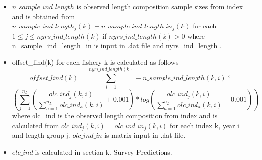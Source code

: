 \documentclass{article}
\begin{document}
\begin{itemize}
    \item $n\_sample\_ind\_length$ is observed length composition sample sizes from index
 and is obtained from $n\_sample\_ind\_length_j(k) = n\_sample\_ind\_length\_in_j(k)$ for each $1\leq j \leq nyrs\_ind\_length(k)$ if $nyrs\_ind\_length(k)>0$ 
 where n\_sample\_ind\_length\_in is input  %
 in .dat file  and nyrs\_ind\_length %
 .
\item offset\_lind(k) for each fishery k is calculated as follows
\begin{equation*}
    offset\_lind(k)=\displaystyle\sum_{i=1}^{nyrs\_ind\_length(k)}-n\_sample\_ind\_length(k,i)*
\end{equation*}
\begin{equation*}
   \left(\sum_{j=1}^{n_L}\left(\dfrac{olc\_ind_j(k,i)}{\sum_{a=1}^{n_L} olc\_ind_a(k,i)}+0.001\right)*log\left(\dfrac{olc\_ind_j(k,i)}{\sum_{a=1}^{n_L} olc\_ind_a(k,i)}+0.001\right)\right)
\end{equation*}
where olc\_ind is the observed length composition from index and is calculated from $olc\_ind_j(k,i)=olc\_ind\_in_j(k,i)$ for each index k, year i and length group j. $olc\_ind\_in$ is matrix input %
in .dat file.
\item $elc\_ind$ is calculated in section k. Survey Predictions.
\end{itemize}
\end{document}
